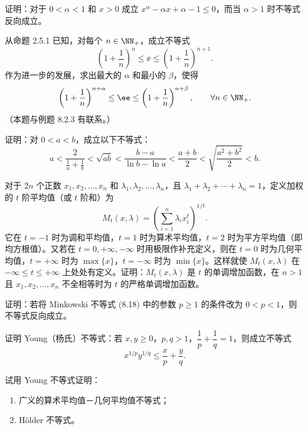 \begin{xexercise}[5]
证明：对于 $0<\alpha<1$ 和 $x>0$ 成立 $x^\alpha-\alpha x+\alpha-1\le0$，而当 $\alpha>1$ 时不等式反向成立。
\end{xexercise}

\begin{xexercise}[6]
从命题 2.5.1 已知，对每个 $n\in\NN_+$，成立不等式
  \[
    \left(1+\frac1n\right)^n\le\ee\le\left(1+\frac1n\right)^{n+1}.
  \]
  作为进一步的发展，求出最大的 $\alpha$ 和最小的 $\beta$，使得
  \[
    \left(1+\frac1n\right)^{n+\alpha}\le\ee\le
    \left(1+\frac1n\right)^{n+\beta},\qquad\forall n\in\NN_+.
  \]
  （本题与例题 8.2.3 有联系。）
\end{xexercise}

\begin{xexercise}[7]
证明：对 $0<a<b$，成立以下不等式：
  \[
    a<\frac2{\frac1a+\frac1b}<\sqrt{ab}<\frac{b-a}{\ln b-\ln a}<\frac{a+b}{2}
    <\sqrt{\frac{a^2+b^2}{2}}<b.
  \]
\end{xexercise}

\begin{xexercise}[8]
对于 $2n$ 个正数 $x_1,x_2,\ldots,x_n$ 和 $\lambda_1,\lambda_2,\ldots,\lambda_n$，且 $\lambda_1+\lambda_2+\cdots+\lambda_n=1$，定义加权的 $t$ 阶平均值（或 $t$ 阶和）为
  \[
    M_t(x,\lambda)=\left(\sum_{i=1}^n\lambda_i x_i^t\right)^{1/t}.
  \]
  它在 $t=-1$ 时为调和平均值，$t=1$ 时为算术平均值，$t=2$ 时为平方平均值（即均方根值）。又若在 $t=0,+\infty,-\infty$ 时用极限作补充定义，则在 $t=0$ 时为几何平均值，$t=+\infty$ 时为 $\max\{x\}$，$t=-\infty$ 时为 $\min\{x\}$。这样就使 $M_t(x,\lambda)$ 在 $-\infty\le t\le+\infty$ 上处处有定义。证明：$M_t(x,\lambda)$ 是 $t$ 的单调增加函数，在 $n>1$ 且 $x_1,x_2,\ldots,x_n$ 不全相等时为 $t$ 的严格单调增加函数。
\end{xexercise}

\begin{xexercise}[9]
证明：若将 Minkowski 不等式 (8.18) 中的参数 $p\ge1$ 的条件改为 $0<p<1$，则不等式反向成立。
\end{xexercise}

\begin{xexercise}[10]
证明 Young（杨氏）不等式：若 $x,y\ge0$，$p,q>1$，$\dfrac1p+\dfrac1q=1$，则成立不等式
  \[
    x^{1/p}y^{1/q}\le\frac xp+\frac yq.
  \]
\end{xexercise}

\begin{xexercise}[11]
试用 Young 不等式证明：
  \begin{enumerate}[label=(\arabic*)]
    \item 广义的算术平均值－几何平均值不等式；
    \item Hölder 不等式。
  \end{enumerate}
\end{xexercise}

